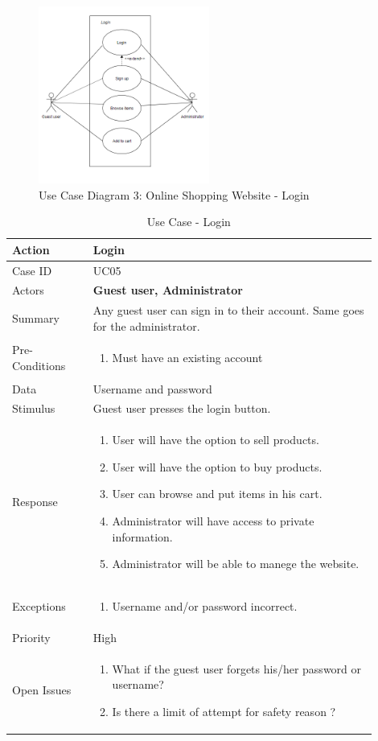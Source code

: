 \documentclass[11pt]{article}
\newcounter{use case ID}
\newcommand\tabularhead[1]{
    \begin{table}[ht]
        \addtocounter{use case ID}{1}
        \caption{Use Case \arabic{use case ID} - #1}
        \vspace{0.2cm}
        \begin{tabular}{|p{0.2\linewidth}|p{0.70\linewidth}|}
            \hline
            \textbf{Action} & \textbf{#1} \\
            \hline}
\newcommand\addrow[2]{#1 & #2\\ \hline}
\newcommand\addmulrow[2]{ \begin{minipage}[t][][t]{2.5cm}#1\end{minipage}
                &\begin{minipage}[t][][t]{11cm}
                    \begin{enumerate}[itemsep=-1ex] #2   \end{enumerate}
                \end{minipage}\vfill\\ \hline}
\newenvironment{usecase}{\tabularhead}
        {\hline\end{tabular}\end{table}}
\begin{document}
\begin{figure}[htbp]
    \centering
    \includegraphics[width=0.5\textwidth]{ucd3.png}
    \caption{Use Case Diagram 3: Online Shopping Website - Login }
    \label{fig:ucd3}
\end{figure}

\begin{usecase}{Login}
    \addrow{Case ID}{UC05}
    \addrow{Actors}{\textbf{Guest user, Administrator}}
    \addrow{Summary}{Any \index{guest user}guest user can sign in to their account. Same goes for the \index{administrator}administrator.}
    \addmulrow{Pre-Conditions}{
        \item Must have an existing account
    }
    \addrow{\index{data}Data}{Username and password}
    \addrow{Stimulus}{\index{guest user}Guest user presses the login button.}
    \addmulrow{Response}{
            \item User will have the option to sell \index{product}products.
            \item User will have the option to buy products.
            \item User can browse and put items in his cart.
            \item \index{administrator}Administrator will have access to private \index{information}information.
            \item Administrator will be able to manege the website.
    }
    \addmulrow{Exceptions}{
        \item Username and/or password incorrect.
    }
    \addrow{Priority}{High}
    \addmulrow{Open Issues}{
        \item What if the \index{guest user}guest user forgets his/her password or username?
        \item Is there a limit of attempt for safety reason ?
    }

\end{usecase}
\end{document}

